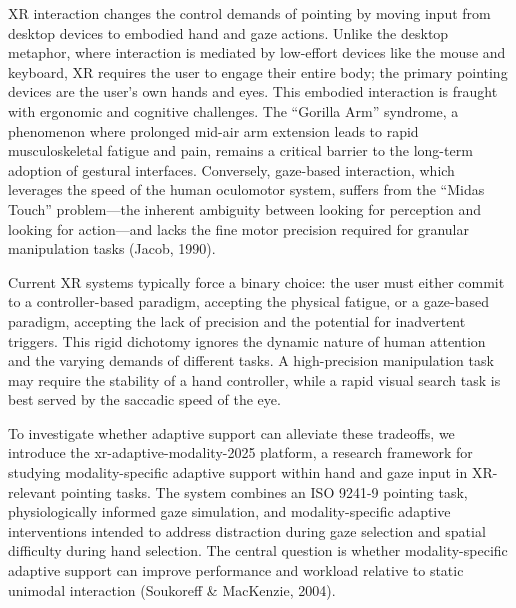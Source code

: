 \documentclass[
  11pt,
  11pt,
  letterpaper]{article}
\begin{document}
XR interaction changes the control demands of pointing by moving input
from desktop devices to embodied hand and gaze actions. Unlike the
desktop metaphor, where interaction is mediated by low-effort devices
like the mouse and keyboard, XR requires the user to engage their entire
body; the primary pointing devices are the user's own hands and eyes.
This embodied interaction is fraught with ergonomic and cognitive
challenges. The ``Gorilla Arm'' syndrome, a phenomenon where prolonged
mid-air arm extension leads to rapid musculoskeletal fatigue and pain,
remains a critical barrier to the long-term adoption of gestural
interfaces. Conversely, gaze-based interaction, which leverages the
speed of the human oculomotor system, suffers from the ``Midas Touch''
problem---the inherent ambiguity between looking for perception and
looking for action---and lacks the fine motor precision required for
granular manipulation tasks (Jacob, 1990).

Current XR systems typically force a binary choice: the user must either
commit to a controller-based paradigm, accepting the physical fatigue,
or a gaze-based paradigm, accepting the lack of precision and the
potential for inadvertent triggers. This rigid dichotomy ignores the
dynamic nature of human attention and the varying demands of different
tasks. A high-precision manipulation task may require the stability of a
hand controller, while a rapid visual search task is best served by the
saccadic speed of the eye.

To investigate whether adaptive support can alleviate these tradeoffs,
we introduce the xr-adaptive-modality-2025 platform, a research
framework for studying modality-specific adaptive support within hand
and gaze input in XR-relevant pointing tasks. The system combines an ISO
9241-9 pointing task, physiologically informed gaze simulation, and
modality-specific adaptive interventions intended to address distraction
during gaze selection and spatial difficulty during hand selection. The
central question is whether modality-specific adaptive support can
improve performance and workload relative to static unimodal interaction
(Soukoreff \& MacKenzie, 2004).
\end{document}
